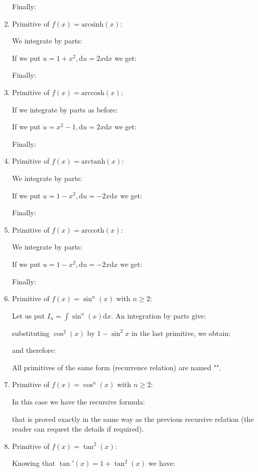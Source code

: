 \begin{enumerate}
		Finally:
		
		\item Primitive of $f(x)=\text{arcsinh}(x)$:
		
		We integrate by parts:
		
		If we put $u=1+x^2,\mathrm{d}u=2x\mathrm{d}x$ we get:
		
		Finally:
		
		\item Primitive of $f(x)=\text{arccosh}(x)$:
		
		If we integrate by parts as before:
		
		If we put $u=x^2-1,\mathrm{d}u=2x\mathrm{d}x$ we get:
		
		Finally:
		
		
		\item Primitive of $f(x)=\text{arctanh}(x)$:
		
		We integrate by parts:
		
		If we put $u=1-x^2,\mathrm{d}u=-2x\mathrm{d}x$ we get:
		
		Finally:
		
		\item Primitive of $f(x)=\text{arccoth}(x)$:
		
		We integrate by parts:
		
		If we put $u=1-x^2,\mathrm{d}u=-2x\mathrm{d}x$ we get:
		
		Finally:
		
		\item Primitive of $f(x)=\sin ^{n}(x)$ with $n \geq 2$:
		
		Let us put $I_n=\int \sin ^n(x)\mathrm{d}x$. An integration by parts give:
		
		substituting $\cos ^2(x)$ by $1-\sin ^2{x}$ in the last primitive, we obtain:
		
		and therefore:
		
		All primitives of the same form (recurrence relation) are named "".
		
		\item Primitive of $f(x)=\cos ^{n}(x)$ with $n \geq 2$:
		
		In this case we have the recursive formula:
		
		that is proved exactly in the same way as the previous recursive relation (the reader can request the details if required).
		\item Primitive of $f(x)=\tan ^{2}(x)$:
		
		Knowing that $\tan'(x)=1+\tan^2(x)$ we have:
		

\end{enumerate}
